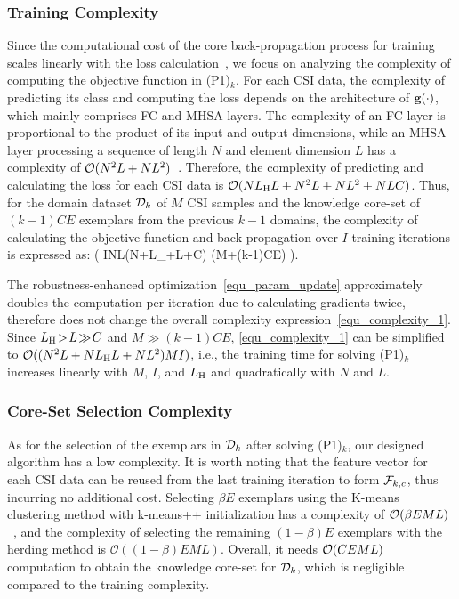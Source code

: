 \subsubsection{Training Complexity}
Since the computational cost of the core back-propagation process for training scales linearly with the loss calculation~\cite[Ch. 6.5]{goodfellow2016deep}, we focus on analyzing the complexity of computing the objective function in (P1)$_k$.
For each CSI data, the complexity of predicting its class and computing the loss depends on the architecture of $\mathbf{g}(\cdot)$, which mainly comprises FC and MHSA layers.
The complexity of an FC layer is proportional to the product of its input and output dimensions, while an MHSA layer processing a sequence of length $N$ and element dimension $L$ has a complexity of $\mathcal{O}(N^2L + NL^2)$~\cite{Han21NIPS_Transformer}.
Therefore, the complexity of predicting and calculating the loss for each CSI data is $\mathcal{O}(NL_{\mathrm{H}}L + N^2L+NL^2 + NLC)$.
Thus, for the domain dataset $\mathcal{D}_k$ of $M$ CSI samples and the knowledge core-set of $(k-1)CE$ exemplars from the previous $k-1$ domains, the complexity of calculating the objective function and back-propagation over $I$ training iterations is expressed as:
\beq
\label{equ_complexity_1}
\cO\big( INL\times(N+L_{\rH}+L+C) (M+(k-1)CE) \big).
\eeq

The robustness-enhanced optimization~\eqref{equ_param_update} approximately doubles the computation per iteration due to calculating gradients twice, therefore does not change the overall complexity expression~\eqref{equ_complexity_1}.
Since $L_{\mathrm{H}}\!>\!L\!\gg\!C$ and $M\gg (k-1) CE$, \eqref{equ_complexity_1} can be simplified to $\mathcal{O}((N^2L+NL_{\mathrm{H}}L+NL^2)MI)$, i.e., the training time for solving (P1)$_k$ increases linearly with $M$, $I$, and $L_{\mathrm{H}}$ and quadratically with $N$ and $L$.

\subsubsection{Core-Set Selection Complexity}
As for the selection of the exemplars in $\mathcal{D}_k$ after solving (P1)$_k$, our designed algorithm has a low complexity.
It is worth noting that the feature vector for each CSI data can be reused from the last training iteration to form $\mathcal{F}_{k,c}$, thus incurring no additional cost.
Selecting $\beta E$ exemplars using the K-means clustering method with k-means++ initialization has a complexity of $\mathcal{O}(\beta EML)$~\cite{Ahmed20Elec_kmeans}, and the complexity of selecting the remaining $(1-\beta)E$ exemplars with the herding method is $\mathcal{O}((1-\beta)EML)$.
Overall, it needs $\mathcal{O}(CEML)$ computation to obtain the knowledge core-set for $\mathcal{D}_k$, which is negligible compared to the training complexity.

